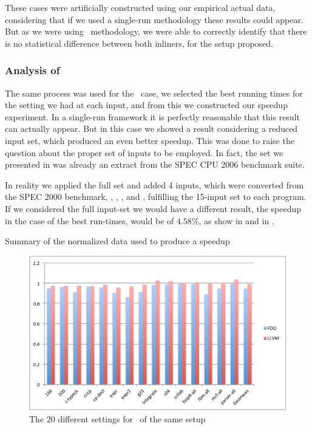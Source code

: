These cases were artificially constructed using our empirical actual data, considering that if we used a single-run methodology these results could appear. But as we were using \CP\ methodology, we were able to correctly identify that there is no statistical difference between both inliners, for the setup proposed.


\subsubsection{Analysis of \gcc}

The same process was used for the \gcc\ case, we selected the best running times for the setting we had at each input, and from this we constructed our speedup experiment. In a single-run framework it is perfectly reasonable that this result can actually appear. But in this case we showed a result considering a reduced input set, which produced an even better speedup. This was done to raise the question about the proper set of inputs to be employed. In fact, the set we presented in  was already an extract from the SPEC CPU 2006 benchmark suite.

In reality we applied the full set and added 4 inputs, which were converted from the SPEC 2000 benchmark, \bzip, \lbm, \mcf, and \parser, fulfilling the 15-input set to each program. If we considered the full input-set we would have a different result, the speedup in the case of the best run-times, would be of $4.58 \%$, as show in  and in .

\begin{table}
  \centering
  \begin{tiny}
  
  \end{tiny}
  \caption{Summary of the normalized data used to produce a speedup}
  \label{tab:fullspeedup}
\end{table}

\begin{figure}
  \centering
  \includegraphics[width=1.00\linewidth]{Figures/speedupgccall}
  \caption{The $20$ different settings for \gzip\ of the same setup}
  \label{fig:gccall}
\end{figure}

